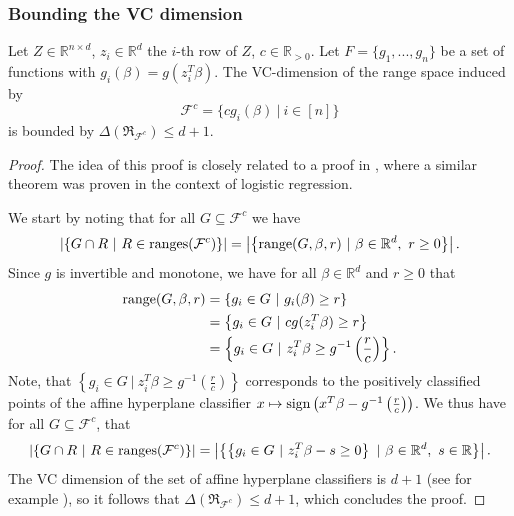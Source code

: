 \subsubsection{Bounding the VC dimension}

\begin{lemma}
    \label{lemma:vcdim-constant}
    Let $Z \in \mathbb{R}^{n \times d}$, $z_i \in \mathbb{R}^d$ the
    $i$-th row of $Z$, $c \in \mathbb{R}_{>0}$.
    Let $F = \{g_1, ..., g_n\}$ be a set of functions with
    $g_i(\beta) = g(z_i^T \beta)$.
    The VC-dimension of the range space induced by
    \begin{equation*}
        \mathcal{F}^c = \{ c g_i(\beta) \ | \ i \in [n] \}
    \end{equation*}
    is bounded by $\Delta(\mathfrak{R}_{\mathcal{F}^c}) \leq d + 1$.
\end{lemma}
\begin{proof}
    The idea of this proof is closely related to a proof in
    \cite{scalable-bayesian-logreg}, where a similar theorem was proven
    in the context of logistic regression.

    We start by noting that for all $G \subseteq \mathcal{F}^c$ we have
    \begin{equation*}
        \left| \left\{ G \cap R \ | \
        R \in \textup{ranges}(\mathcal{F}^c) \right\} \right|
        =
        \left| \left\{ \textup{range}(G, \beta, r) \ | \
        \beta \in \mathbb{R}^d, \ r \geq 0 \right\} \right|.
    \end{equation*}
    Since $g$ is invertible and monotone, we have for all
    $\beta \in \mathbb{R}^d$ and $r \geq 0$ that
    \begin{align*}
        \textup{range}(G, \beta, r)
         & = \left\{ g_i \in G \ |\ g_i(\beta) \geq r \right\}                                   \\
         & = \left\{ g_i \in G \ |\ c g(z_i^T \beta) \geq r \right\}                             \\
         & = \left\{ g_i \in G \ |\ z_i^T \beta \geq g^{-1} \left( \frac{r}{c} \right) \right\}.
    \end{align*}
    Note, that $\left\{ g_i \in G
        \ |\ z_i^T \beta \geq g^{-1} \left( \frac{r}{c} \right) \right\}$
    corresponds to the positively classified points of the
    affine hyperplane classifier
    $x \mapsto \textup{sign}\left(
        x^T\beta - g^{-1}\left(\frac{r}{c}\right) \right)$.
    We thus have for all $G \subseteq \mathcal{F}^c$, that
    \begin{equation*}
        \left| \left\{ G \cap R \ | \
        R \in \textup{ranges}(\mathcal{F}^c) \right\} \right|
        =
        \left| \left\{ \left\{ g_i \in G
        \ |\ z_i^T \beta - s \geq 0 \right\} \ | \
        \beta \in \mathbb{R}^d, \ s \in \mathbb{R} \right\} \right|.
    \end{equation*}
    The VC dimension of the set of affine hyperplane classifiers is
    $d+1$ (see for example \cite{computational-learning-theory}),
    so it follows that
    $\Delta(\mathfrak{R}_{\mathcal{F}^c}) \leq d + 1$,
    which concludes the proof.
\end{proof}

